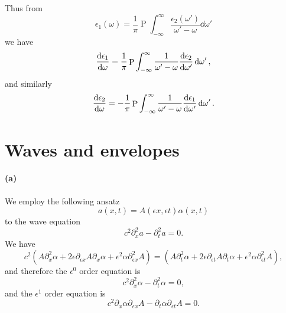 \documentclass[hyperref, a4paper]{article}
\DeclareMathOperator{\primevalue}{P}
\begin{document}
Thus from 
\begin{equation}
    \epsilon_1(\omega) = \frac{1}{\pi} \primevalue \int_{-\infty}^{\infty} \frac{
            \epsilon_2(\omega')
        }{
            \omega' - \omega
        } \dd{\omega'} 
\end{equation}
we have 
\begin{equation}
    \dv{\epsilon_1}{\omega} = \frac{1}{\pi} \primevalue \int_{-\infty}^{\infty} \frac{
            1
        }{
            \omega' - \omega
        } \dv{\epsilon_2}{\omega'} \dd{\omega'} ,
\end{equation}
and similarly 
\begin{equation}
    \dv{\epsilon_2}{\omega} = - \frac{1}{\pi} \primevalue \int_{-\infty}^{\infty} \frac{
            1
        }{
            \omega' - \omega
        } \dv{\epsilon_1}{\omega'} \dd{\omega'} .
\end{equation}

\section{Waves and envelopes}

\paragraph{(a)} We employ the following ansatz 
\begin{equation}
    a(x, t) = A(\epsilon x, \epsilon t) \alpha(x, t)
\end{equation}
to the wave equation 
\begin{equation}
    c^2 \partial_x^2 a - \partial_t^2 a = 0.
\end{equation}
We have 
\begin{equation}
    c^2 \left(
        A \partial_x^2 \alpha 
        + 2 \epsilon \partial_{\epsilon x} A \partial_x \alpha
        + \epsilon^2 \alpha \partial_{\epsilon x}^2 A
    \right) = 
    \left(
        A \partial_t^2 \alpha 
        + 2 \epsilon \partial_{\epsilon t} A \partial_t \alpha
        + \epsilon^2 \alpha \partial_{\epsilon t}^2 A
    \right),
\end{equation}
and therefore the $\epsilon^0$ order equation is 
\begin{equation}
    c^2 \partial_x^2 \alpha - \partial_t^2 \alpha = 0,
    \label{eq:eps-0}
\end{equation}
and the $\epsilon^1$ order equation is 
\begin{equation}
    c^2 \partial_x \alpha \partial_{\epsilon x} A - \partial_t \alpha \partial_{\epsilon t} A = 0.
    \label{eq:eps-1}
\end{equation}
\end{document}
